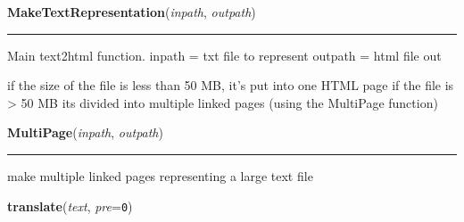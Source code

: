 \hspace{.8\funcindent}\begin{boxedminipage}{\funcwidth}

    \raggedright \textbf{MakeTextRepresentation}(\textit{inpath}, \textit{outpath})

    \vspace{-1.5ex}

    \rule{\textwidth}{0.5\fboxrule}
\setlength{\parskip}{2ex}
    Main text2html function. inpath  = txt file to represent outpath = html
    file out

    if the size of the file is less than 50 MB, it's put into one HTML page
    if the file is {\textgreater} 50 MB its divided into multiple linked 
    pages (using the MultiPage function)

\setlength{\parskip}{1ex}
    \end{boxedminipage}

    \label{System:Web:text2html:MultiPage}

    \vspace{0.5ex}

\hspace{.8\funcindent}\begin{boxedminipage}{\funcwidth}

    \raggedright \textbf{MultiPage}(\textit{inpath}, \textit{outpath})

    \vspace{-1.5ex}

    \rule{\textwidth}{0.5\fboxrule}
\setlength{\parskip}{2ex}
    make multiple linked pages representing a large text file

\setlength{\parskip}{1ex}
    \end{boxedminipage}

    \label{System:Web:text2html:translate}

    \vspace{0.5ex}

\hspace{.8\funcindent}\begin{boxedminipage}{\funcwidth}

    \raggedright \textbf{translate}(\textit{text}, \textit{pre}={\tt 0})

\setlength{\parskip}{2ex}
\setlength{\parskip}{1ex}
    \end{boxedminipage}

